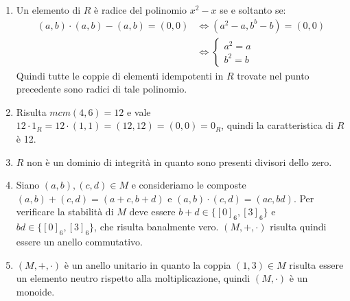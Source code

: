 \begin{enumerate}[label=(\textit{\roman*})]
	\item Un elemento di $R$ è radice del polinomio $x^{2}-x$ se e soltanto se:
	\begin{align*}
		(a,b)\cdot (a,b) - (a,b) = (0,0) &\iff (a^{2}-a,b^{b}-b) = (0,0) \\
		&\iff \begin{cases*}
			a^{2} = a \\
			b^{2} = b
		\end{cases*}
	\end{align*}
Quindi tutte le coppie di elementi idempotenti in $R$ trovate nel punto precedente sono radici di tale polinomio.
	\item Risulta $mcm(4,6)=12$ e vale $12 \cdot 1_{R}=12 \cdot (1,1)=(12,12)=(0,0)=0_{R}$, quindi la caratteristica di $R$ è 12.
	\item $R$ non è un dominio di integrità in quanto sono presenti divisori dello zero.
	\item Siano $(a,b),(c,d) \in M$ e consideriamo le composte $(a,b)+(c,d) =(a+c,b+d)$ e $(a,b)\cdot(c,d)=(ac,bd)$. Per verificare la stabilità di $M$ deve essere $b+d \in \{[0]_{6},[3]_{6}\}$ e $bd \in \{[0]_{6},[3]_{6}\}$, che risulta banalmente vero. $(M,+,\cdot)$ risulta quindi essere un anello commutativo. 
	\item $(M,+,\cdot)$ è un anello unitario in quanto la coppia $(1,3) \in M$ risulta essere un elemento neutro rispetto alla moltiplicazione, quindi $(M,\cdot)$ è un monoide.
\end{enumerate}

